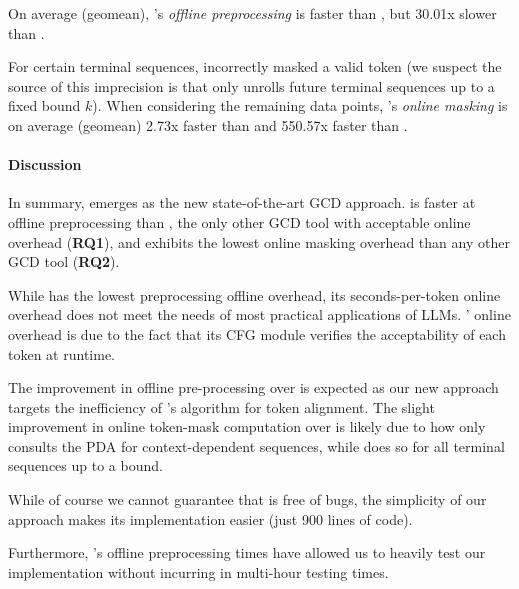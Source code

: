 % 
On average (geomean), \name's \textit{offline preprocessing} is \nx  faster than \syncode, but 30.01x slower than \outlines.

For certain terminal sequences, \syncode incorrectly masked a valid token (we suspect the source of this imprecision is that \syncode only unrolls future terminal sequences up to a fixed bound $k$). 
% 
When considering the remaining data points, \name's \textit{online masking} is on average (geomean) 2.73x faster than \syncode and 550.57x faster than \outlines.



% 

\paragraph{Discussion}
In summary, \name emerges as the new state-of-the-art GCD approach.
\name is \nx faster at offline preprocessing than \syncode, the only other GCD tool with acceptable online overhead (\textbf{RQ1}), and exhibits the lowest online masking overhead than any other GCD tool (\textbf{RQ2}).

While \outlines has the lowest preprocessing offline overhead, its seconds-per-token online overhead does not meet the needs of most practical applications of LLMs.
% 
\outlines' online overhead is due to the fact that its CFG module verifies the acceptability of each token at runtime.

The improvement in offline pre-processing over \syncode is expected as our new approach targets the inefficiency of \syncode's algorithm for token alignment.
% 
The slight improvement in online token-mask computation over \syncode is likely due to how \name only consults the PDA for context-dependent sequences, while \syncode does so for all terminal sequences up to a bound.


% 
While of course we cannot guarantee that \name is free of bugs, the simplicity of our approach makes its implementation easier (just 900 lines of code).

Furthermore, \name's  offline preprocessing times have allowed us to heavily test our implementation without incurring in multi-hour testing times.

